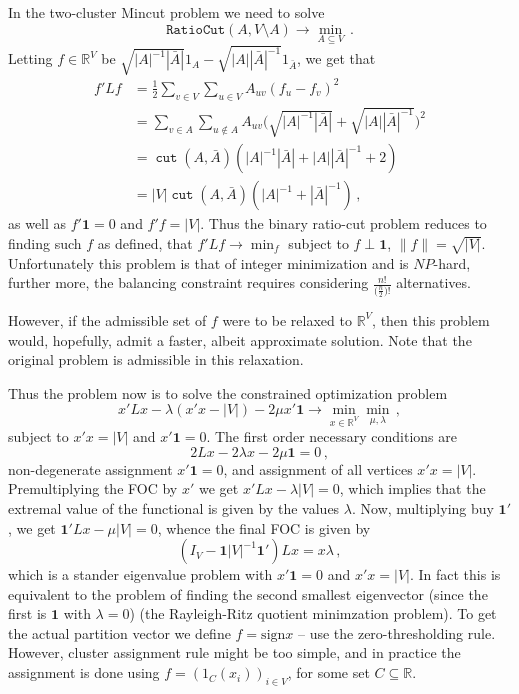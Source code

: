 \documentclass[a4paper]{article}
\newcommand{\Real}{\mathbb{R}}
\newcommand{\cut}{\mathop{\mathtt{cut}}\nolimits}
\newcommand{\one}{\mathbf{1}}
\begin{document}
In the two-cluster Mincut problem we need to solve
$$ \mathtt{RatioCut}(A, V\setminus A) \to \min_{A\subseteq V} \,. $$ Letting $f \in \Real^V$
be $\sqrt{|A|^{-1}|\bar{A}|} 1_A - \sqrt{|A||\bar{A}|^{-1}} 1_{\bar{A}}$, we get that
\begin{align*}
f' L f
    &= \frac{1}{2} \sum_{v\in V} \sum_{u\in V} A_{uv} (f_u - f_v)^2\\
    &= \sum_{v\in A} \sum_{u\notin A} A_{uv} \bigl(
        \sqrt{|A|^{-1}|\bar{A}|} + \sqrt{|A||\bar{A}|^{-1}}
        \bigr)^2\\
    &= \cut(A, \bar{A}) (|A|^{-1}|\bar{A}| + |A||\bar{A}|^{-1} + 2) \\
    &= |V| \cut(A, \bar{A}) (|A|^{-1} + |\bar{A}|^{-1}) \,,
\end{align*}
as well as $f'\one = 0$ and $f'f = |V|$.
Thus the binary ratio-cut problem reduces to finding such $f$ as defined, that
$f' L f \to \min_f$ subject to $f \perp \one$, $\|f\| = \sqrt{|V|}$. Unfortunately
this problem is that of integer minimization and is $NP$-hard, further more, the
balancing constraint requires considering $\frac{n!}{\big(\frac{n}{2}\big)!}$ alternatives.

However, if the admissible set of $f$ were to be relaxed to $\Real^V$, then this
problem would, hopefully, admit a faster, albeit approximate solution. Note that
the original problem is admissible in this relaxation.

Thus the problem now is to solve the constrained optimization problem
$$ x' L x - \lambda(x' x - |V|) - 2 \mu x'\one
    \to \min_{x\in \Real^V} \min_{\mu, \lambda}
    \,, $$
subject to $x'x = |V|$ and $x'\one = 0$. The first order necessary conditions
are 
$$ 2 L x - 2 \lambda x - 2 \mu \one = 0 \,, $$
non-degenerate assignment $x'\one = 0$, and assignment of all vertices $x'x = |V|$.
Premultiplying the FOC by $x'$ we get $x' L x - \lambda |V| = 0$, which implies that
the extremal value of the functional is given by the values $\lambda$. Now, multiplying
buy $\one'$, we get $\one' L x - \mu |V| = 0$, whence the final FOC is given by
$$ (I_V - \one |V|^{-1} \one') L x = x \lambda \,, $$
which is a stander eigenvalue problem with $x'\one = 0$ and $x'x = |V|$. In fact
this is equivalent to the problem of finding the second smallest eigenvector (since
the first is $\one$ with $\lambda = 0$) (the Rayleigh-Ritz quotient minimzation
problem). To get the actual partition vector we define $f=\text{sign} x$ -- use
the zero-thresholding rule. However, cluster assignment rule might be too simple,
and in practice the assignment is done using $f = (1_C(x_i))_{i\in V}$, for some
set $C\subseteq \Real$.
\end{document}
